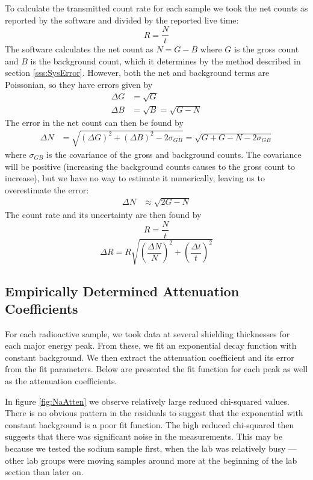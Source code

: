 \documentclass[letter]{article}
\begin{document}
To calculate the transmitted count rate for each sample we took the net counts as reported by the software and divided by the reported live time:
\begin{equation}
R = \frac{N}{t}
\end{equation}
The software calculates the net count as $N = G - B$ where $G$ is the gross count and $B$ is the background count, which it determines by the method described in section \ref{sss:SysError}. However, both the net and background terms are Poissonian, so they have errors given by
\begin{align}
\Delta G &= \sqrt{G} \\
\Delta B &= \sqrt{B} = \sqrt{G - N}
\end{align}
The error in the net count can then be found by
\begin{align}
\Delta N 
&= 
\sqrt{ (\Delta G)^2 + (\Delta B)^2 - 2 \sigma_{GB}}
=
\sqrt{ G + G - N - 2 \sigma_{GB}}
\end{align}
where $\sigma_{GB}$ is the covariance of the gross and background counts. The covariance will be positive (increasing the background counts causes to the gross count to increase), but we have no way to estimate it numerically, leaving us to overestimate the error:
\begin{align}
\Delta N &\approx \sqrt{2G - N}
\end{align} 
The count rate and its uncertainty are then found by
\begin{equation}
R = \frac{N}{t}
\end{equation}
\begin{equation}
\Delta R = R \sqrt{ \left( \frac{\Delta N}{N} \right)^2 + \left( \frac{\Delta t}{t} \right)^2}
\end{equation}


\subsection{Empirically Determined Attenuation Coefficients}

For each radioactive sample, we took data at several shielding thicknesses for each major energy peak. From these, we fit an exponential decay function with constant background. We then extract the attenuation coefficient and its error from the fit parameters. Below are presented the fit function for each peak as well as the attenuation coefficients.


In figure \ref{fig:NaAtten} we observe relatively large reduced chi-squared values. There is no obvious pattern in the residuals to suggest that the exponential with constant background is a poor fit function. The high reduced chi-squared then suggests that there was significant noise in the measurements. This may be because we tested the sodium sample first, when the lab was relatively busy --- other lab groups were moving samples around more at the beginning of the lab section than later on.
\end{document}
